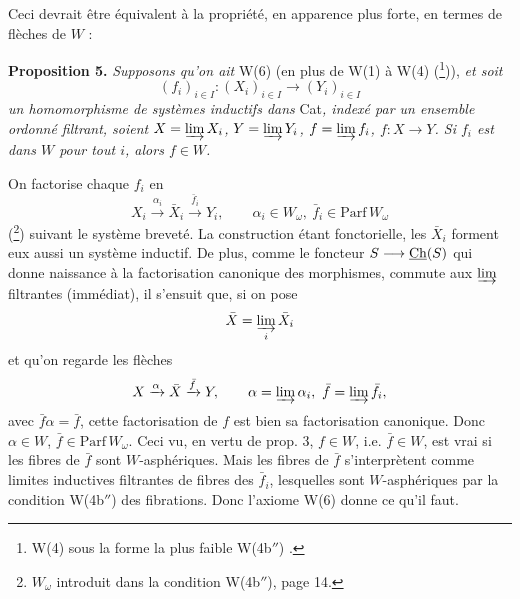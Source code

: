 Ceci devrait être équivalent à la propriété, en apparence plus forte, en termes de flèches de $W$ :

\textbf{Proposition 5.} \textit{Supposons qu'on ait} W(6) (en plus de W(1) à W(4) (\footnote[34]{W(4) sous la forme la plus faible W(4b$''$) .})),
\textit{et soit}
\[ (f_i)_{i\in I} : (X_i)_{i\in I} \longrightarrow (Y_i)_{i\in I} \]
\textit{un homomorphisme de systèmes inductifs dans} Cat\textit{, indexé par un ensemble ordonné filtrant, soient $X = \varinjlim X_i$, $Y = \varinjlim Y_i$, $f = \varinjlim f_i$, $f : X \longrightarrow Y$. Si $f_i$ est dans $W$ pour tout $i$, alors $f \in W$.}

On factorise chaque $f_i$ en
\[ X_i \xrightarrow{\alpha_i} \bar{X}_i \xrightarrow{\bar{f}_i} Y_i, \qquad \alpha_i \in W_\omega,\ \bar{f}_i \in \mathrm{Parf}\, W_\omega \]
(\footnote[35]{$W_\omega$ introduit dans la condition W(4b$''$), page 14.}) suivant le système breveté. La construction étant fonctorielle, les $\bar{X}_i$ forment eux aussi un système inductif. De plus, comme le foncteur $S \longrightarrow \underline{\mathrm{Ch}}(S)$ qui donne naissance à la factorisation canonique des morphismes, commute aux $\varinjlim$ filtrantes (immédiat), il s'ensuit que, si on pose
\[ \bar{X} = \varinjlim_{i} \bar{X}_i \]
et qu'on regarde les flèches
\[ X \xrightarrow{\alpha} \bar{X} \xrightarrow{\bar{f}} Y, \qquad \alpha = \varinjlim \alpha_i,\ \bar{f} = \varinjlim \bar{f}_i, \]
avec $\bar{f}\alpha = \bar{f}$, cette factorisation de $f$ est bien sa factorisation canonique. Donc $\alpha \in W$, %
$\bar{f} \in \mathrm{Parf}\, W_\omega$. Ceci vu, en vertu de prop. 3, $f \in W$, i.e. $\bar{f} \in W$, est vrai si les fibres de $\bar{f}$ sont $W$-asphériques. Mais les fibres de $\bar{f}$ s'interprètent comme limites inductives filtrantes de fibres des $\bar{f}_i$, lesquelles sont $W$-asphériques par la condition W(4b$''$) des fibrations. Donc l'axiome W(6) donne ce qu'il faut.

